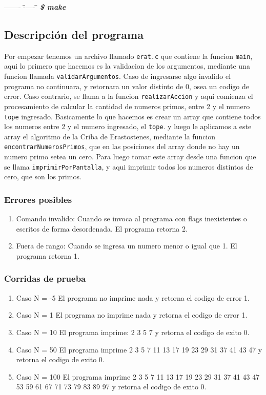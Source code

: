 \documentclass[a4paper,10pt]{article}
\begin{document}
\begin{tabbing}
------- \= ----- \= \kill
\> \textbf{\emph{\$ make}}\\ 
\end{tabbing}

\subsection {{\normalsize Descripción del programa}}

Por empezar tenemos un archivo llamado \texttt{erat.c} que contiene la funcion
\texttt{main}, aqui lo primero que hacemos es la validacion de los argumentos, mediante 
una funcion llamada \texttt{validarArgumentos}. Caso de ingresarse algo invalido 
el programa no continuara, y retornara un valor distinto de 0, osea un codigo de error. Caso contrario, 
se llama a la funcion \texttt{realizarAccion} y aqui comienza el procesamiento de calcular 
la cantidad de numeros primos, entre 2 y el numero \texttt{tope} ingresado. Basicamente lo que hacemos es 
crear un array que contiene todos los numeros entre 2 y el numero ingresado, el \texttt{tope}. 
y luego le aplicamos a este array el algoritmo de la Criba de Erastostenes, mediante la funcion \texttt{encontrarNumerosPrimos},
que en las posiciones del array donde no hay un numero primo setea un cero.
Para luego tomar este array desde una funcion que se llama \texttt{imprimirPorPantalla}, y aqui imprimir todos los numeros distintos
de cero, que son los primos.

\subsubsection {{\normalsize Errores posibles}}

\begin{enumerate}
\item Comando invalido: Cuando se invoca al programa con flags inexistentes o escritos de forma desordenada. El programa retorna 2.
\item Fuera de rango: Cuando se ingresa un numero menor o igual que 1. El programa retorna 1. 
\end{enumerate}

\subsubsection {{\normalsize Corridas de prueba}}

\begin{enumerate}
\item Caso N = -5
El programa no imprime nada y retorna el codigo de error 1.
\item Caso N = 1
El programa no imprime nada y retorna el codigo de error 1. 
\item Caso N = 10
El programa imprime: 2 3 5 7 y retorna el codigo de exito 0.
\item Caso N = 50
El programa imprime 2 3 5 7 11 13 17 19 23 29 31 37 41 43 47 y retorna el codigo de exito 0.
\item Caso N = 100
El programa imprime 2 3 5 7 11 13 17 19 23 29 31 37 41 43 47 53 59 61 67 71 73 79 83 89 97 y retorna el codigo de exito 0.  
\end{enumerate}
	
\end{document}
